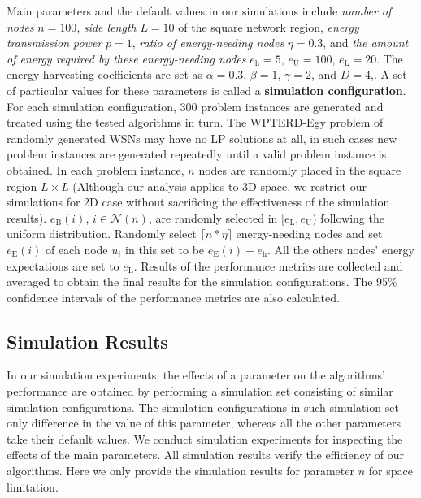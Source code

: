\documentclass[journal,10pt]{IEEEtran}
\begin{document}
Main parameters and the default values in our simulations include \textit{number of nodes} $n{=}100$, \textit{side length} $L{=}10$ of the square network region, \textit{energy transmission power} $p{=}1$, \textit{ratio of energy-needing nodes} $\eta{=}0.3$, and \textit{the amount of energy required by these energy-needing nodes} $e_\text{h}{=}5$, $e_\text{U}{=}100$, $e_\text{L}{=}20$. The energy harvesting coefficients are set as $\alpha{=}0.3$, $\beta{=}1$, $\gamma{=}2$, and $D{=}4$,. A set of particular values for these parameters is called a \textbf{simulation configuration}. For each simulation configuration, 300 problem instances are generated and treated using the tested algorithms in turn. The WPTERD-Egy problem of randomly generated WSNs may have no LP solutions at all, in such cases new problem instances are generated repeatedly until a valid problem instance is obtained. In each problem instance, $n$ nodes are randomly placed in the square region $L{\times}L$ (Although our analysis applies to 3D space, we restrict our simulations for 2D case without sacrificing the effectiveness of the simulation results). $e_\text{B}(i)$, $i{\in}\mathcal{N}(n)$, are randomly selected in $[e_\text{L},e_\text{U})$ following the uniform distribution. Randomly select ${\lceil}n{*}\eta{\rceil}$ energy-needing nodes and set $e_\text{E}(i)$ of each node $u_i$ in this set to be $e_\text{E}(i){+}e_\text{h}$. All the others nodes' energy expectations are set to $e_\text{L}$. Results of the performance metrics are collected and averaged to obtain the final results for the simulation configurations. The 95\% confidence intervals of the performance metrics are also calculated.

\subsection{Simulation Results}

In our simulation experiments, the effects of a parameter on the algorithms' performance are obtained by performing a simulation set consisting of similar simulation configurations. The simulation configurations in such simulation set only difference in the value of this parameter, whereas all the other parameters take their default values. We conduct simulation experiments for inspecting the effects of the main parameters. All simulation results verify the efficiency of our algorithms. Here we only provide the simulation results for parameter $n$ for space limitation.
\end{document}
